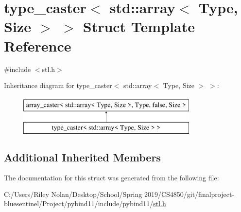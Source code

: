 \hypertarget{structtype__caster_3_01std_1_1array_3_01_type_00_01_size_01_4_01_4}{}\section{type\+\_\+caster$<$ std\+::array$<$ Type, Size $>$ $>$ Struct Template Reference}
\label{structtype__caster_3_01std_1_1array_3_01_type_00_01_size_01_4_01_4}


{\ttfamily \#include $<$stl.\+h$>$}

Inheritance diagram for type\+\_\+caster$<$ std\+::array$<$ Type, Size $>$ $>$\+:\begin{figure}[H]
\begin{center}
\leavevmode
\includegraphics[height=2.000000cm]{structtype__caster_3_01std_1_1array_3_01_type_00_01_size_01_4_01_4}
\end{center}
\end{figure}
\subsection*{Additional Inherited Members}


The documentation for this struct was generated from the following file\+:\begin{DoxyCompactItemize}
\item 
C\+:/\+Users/\+Riley Nolan/\+Desktop/\+School/\+Spring 2019/\+C\+S4850/git/finalproject-\/bluesentinel/\+Project/pybind11/include/pybind11/\mbox{\hyperlink{stl_8h}{stl.\+h}}\end{DoxyCompactItemize}
